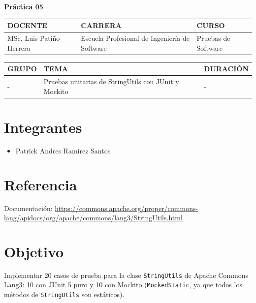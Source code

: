 \documentclass{article}
\newcommand{\csdocente}{MSc. Luis Pati\~no Herrera}
\newcommand{\cscurso}{Pruebas de Software}
\newcommand{\csescuela}{Escuela Profesional de Ingenier\'ia de Software}
\newcommand{\cspracnr}{05}
\newcommand{\cstema}{Pruebas unitarias de StringUtils con JUnit y Mockito}
\begin{document}
\vspace*{10px}

\begin{center}
    \fontsize{17}{17} \textbf{ Pr\'actica \cspracnr}
\end{center}

\renewcommand{\arraystretch}{1.5}

\begin{table}[h]
\begin{tabular}{|x{4.7cm}|x{4.8cm}|x{4.8cm}|}
\hline
\textbf{DOCENTE} & \textbf{CARRERA} & \textbf{CURSO} \\
\hline
\csdocente & \csescuela & \cscurso \\
\hline
\end{tabular}
\end{table}

\begin{table}[h]
\begin{tabular}{|x{4.7cm}|x{4.8cm}|x{4.8cm}|}
\hline
\textbf{GRUPO} & \textbf{TEMA} & \textbf{DURACI\'ON} \\
\hline
- & \cstema & - \\
\hline
\end{tabular}
\end{table}

\renewcommand{\arraystretch}{1}

\section*{Integrantes}
\begin{itemize}
    \item Patrick Andres Ramirez Santos
\end{itemize}

\section*{Referencia}
Documentaci\'on: \url{https://commons.apache.org/proper/commons-lang/apidocs/org/apache/commons/lang3/StringUtils.html}

\tableofcontents
\newpage

\section{Objetivo}
Implementar 20 casos de prueba para la clase \texttt{StringUtils} de Apache Commons Lang3: 10 con JUnit 5 puro y 10 con Mockito (\texttt{MockedStatic}, ya que todos los m\'etodos de \texttt{StringUtils} son est\'aticos).
\end{document}

